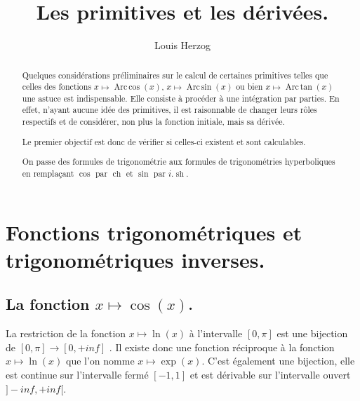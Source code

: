\documentclass[a4paper,14pt]{extreport} %
\newcommand{\sommaire}{\shorttoc{Sommaire}{1}}
\renewcommand{\sinh}{\mathop{\mathrm{sh}}}
\renewcommand{\cosh}{\mathop{\mathrm{ch}}}
\renewcommand{\arcsin}{\mathop{\mathrm{Arc\,sin}}}
\renewcommand{\arccos}{\mathop{\mathrm{Arc\,cos}}}
\renewcommand{\arctan}{\mathop{\mathrm{Arc\,tan}}}
\begin{document}
 


\setlength{\parindent}{0pt}




\title{Les primitives et les dérivées.}
\date{}


\author{Louis Herzog} 

\maketitle 

\setcounter{tocdepth}{2}
\tableofcontents


\begin{abstract}
Quelques considérations préliminaires sur le calcul de certaines primitives telles que celles des fonctions 
 $x \mapsto \arccos(x) $,  $x \mapsto \arcsin(x) $ ou bien $x \mapsto \arctan(x) $ une astuce est indispensable. Elle consiste à procéder à une intégration par parties. En effet, n'ayant aucune idée des primitives, il est raisonnable de changer leurs rôles respectifs et de considérer, non plus la fonction initiale, mais sa dérivée.
 
Le premier objectif est donc de vérifier si celles-ci existent et sont calculables.


On passe des formules de trigonométrie aux formules de trigonométries hyperboliques en remplaçant $\cos$ par $\cosh$ et $\sin$ par $i . \sinh$.


\end{abstract} 

\chapter{Fonctions trigonométriques et trigonométriques inverses.}


\section{La fonction  $x \mapsto \cos(x)$.}

La restriction de la fonction $x \mapsto \ln(x) $ à l'intervalle $[0,\pi]$ est une bijection de $[0,\pi] \rightarrow [0,+inf]$ . Il existe donc une fonction réciproque à la fonction $x \mapsto \ln(x) $ que l'on nomme $x \mapsto \exp(x) $. C'est également une bijection, elle est continue sur l'intervalle fermé  $ [-1,1]$ et est dérivable sur l'intervalle ouvert $]-inf,+inf[$.
\end{document}
